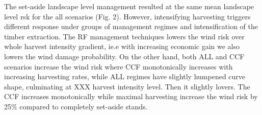 \documentclass[]{elsarticle} %
\newenvironment{Shaded}{\begin{snugshade}}{\end{snugshade}}
\newcommand{\KeywordTok}[1]{\textcolor[rgb]{0.13,0.29,0.53}{\textbf{#1}}}
\newcommand{\DataTypeTok}[1]{\textcolor[rgb]{0.13,0.29,0.53}{#1}}
\newcommand{\DecValTok}[1]{\textcolor[rgb]{0.00,0.00,0.81}{#1}}
\newcommand{\StringTok}[1]{\textcolor[rgb]{0.31,0.60,0.02}{#1}}
\newcommand{\CommentTok}[1]{\textcolor[rgb]{0.56,0.35,0.01}{\textit{#1}}}
\newcommand{\OperatorTok}[1]{\textcolor[rgb]{0.81,0.36,0.00}{\textbf{#1}}}
\newcommand{\NormalTok}[1]{#1}
\begin{document}
The set-aside landscape level management resulted at the same mean
landscape level rsk for the all scenarios (Fig. 2). However,
intensifying harvesting triggers different response under groups of
management regimes and intensification of the timber extraction. The RF
management techniques lowers the wind risk over whole harvest intensity
gradient, ie.e with increasing economic gain we also lowers the wind
damage probability. On the other hand, both ALL and CCF scenarios
increase the wind risk where CCF monotonically increases with increasing
harvesting rates, while ALL regimes have slightly humpened curve shape,
culminating at XXX harvest intensity level. Then it slightly lovers. The
CCF increases monotonically while maximal harvesting increase the wind
risk by 25\% compared to completely set-aside stands.

\begin{Shaded}
\end{Shaded}
\end{document}
